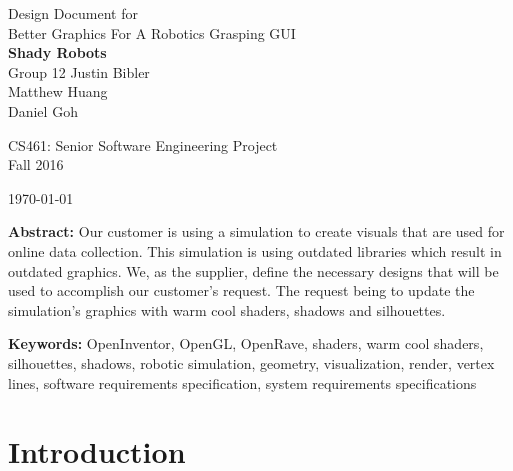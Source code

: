 \documentclass[10pt,journal,compsoc,draftclsnofoot]{IEEEtran}
\begin{document}
\onecolumn

\begin{titlepage}
\null
\vspace{15mm}

\begin{flushleft}
\begin{bfseries}
	\vskip2mm
	\Huge{Design Document for\\ Better Graphics For A Robotics Grasping GUI}\\
	\vspace{15mm}
	\textbf{\huge Shady Robots} \\
	\vskip2mm
	\large{Group 12}
	\vskip5mm
	\Large{Justin Bibler \\
	Matthew Huang \\
	Daniel Goh \\}
\end{bfseries}

\vspace{15mm}
\Large{CS461: Senior Software Engineering Project} \\
\Large{Fall 2016} \\

\vspace{5mm}

\today

\vfill

\begin{normalsize}
{\bf Abstract:}
Our customer is using a simulation to create visuals that are used for online data collection.
This simulation is using outdated libraries which result in outdated graphics.
We, as the supplier, define the necessary designs that will be used to accomplish our customer's request.
The request being to update the simulation's graphics with warm cool shaders, shadows and silhouettes.

{\bf Keywords:} OpenInventor, OpenGL, OpenRave, shaders, warm cool shaders, silhouettes, shadows, robotic simulation, geometry, visualization, render,
vertex lines, software requirements specification, system requirements specifications
\end{normalsize}
\end{flushleft}

\newpage

\end{titlepage}

\section{Introduction}
\end{document}
